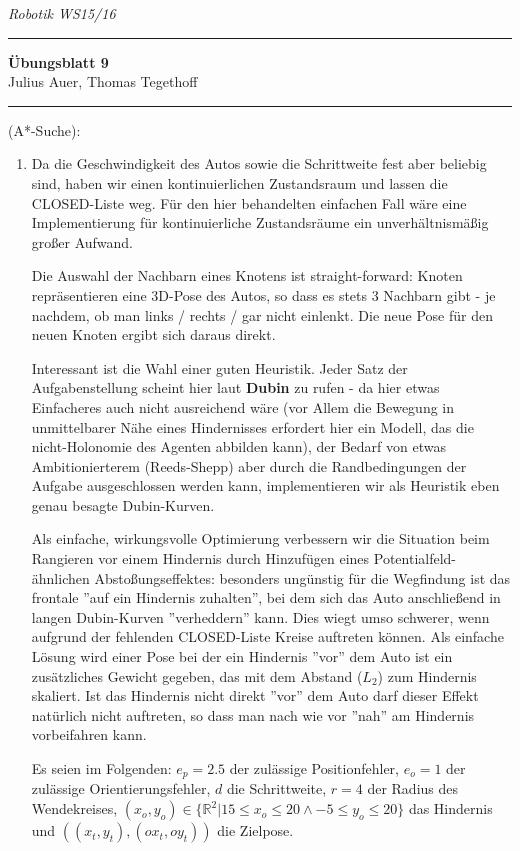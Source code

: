 \documentclass[a4paper, titlepage=false, parskip=full-, 10pt]{scrartcl}
\newcounter{tasknbr}
\newenvironment{task}[1]{{\bf Aufgabe \arabic {tasknbr}\stepcounter{tasknbr}} (#1):\begin{enumerate}}{\end{enumerate}}
\newcommand{\lecture}{Robotik WS15/16}
\newcommand{\tutor}{}
\newcommand{\assignmentnbr}{9}
\newcommand{\students}{Julius Auer, Thomas Tegethoff}
\begin{document}
  
{\small \textsl{\lecture \hfill \tutor}}
\hrule
\begin{center}
\textbf{Übungsblatt \assignmentnbr}\\
[\bigskipamount]
{\small \students}
\end{center}
\hrule

\begin{task}{A*-Suche}
\item[]
Da die Geschwindigkeit des Autos sowie die Schrittweite fest aber beliebig sind, haben wir einen kontinuierlichen Zustandsraum und lassen die CLOSED-Liste weg. Für den hier behandelten einfachen Fall wäre eine Implementierung für kontinuierliche Zustandsräume ein unverhältnismäßig großer Aufwand.

Die Auswahl der Nachbarn eines Knotens ist straight-forward: Knoten repräsentieren eine 3D-Pose des Autos, so dass es stets 3 Nachbarn gibt - je nachdem, ob man links / rechts / gar nicht einlenkt. Die neue Pose für den neuen Knoten ergibt sich daraus direkt.

Interessant ist die Wahl einer guten Heuristik. Jeder Satz der Aufgabenstellung scheint hier laut {\bf Dubin} zu rufen - da hier etwas Einfacheres auch nicht ausreichend wäre (vor Allem die Bewegung in unmittelbarer Nähe eines Hindernisses erfordert hier ein Modell, das die nicht-Holonomie des Agenten abbilden kann), der Bedarf von etwas Ambitionierterem (Reeds-Shepp) aber durch die Randbedingungen der Aufgabe ausgeschlossen werden kann, implementieren wir als Heuristik eben genau besagte Dubin-Kurven.

Als einfache, wirkungsvolle Optimierung verbessern wir die Situation beim Rangieren vor einem Hindernis durch Hinzufügen eines Potentialfeld-ähnlichen Abstoßungseffektes: besonders ungünstig für die Wegfindung ist das frontale ''auf ein Hindernis zuhalten'', bei dem sich das Auto anschließend in langen Dubin-Kurven ''verheddern'' kann. Dies wiegt umso schwerer, wenn aufgrund der fehlenden CLOSED-Liste Kreise auftreten können. Als einfache Lösung wird einer Pose bei der ein Hindernis ''vor'' dem Auto ist ein zusätzliches Gewicht gegeben, das mit dem Abstand ($L_2$) zum Hindernis skaliert. Ist das Hindernis nicht direkt ''vor'' dem Auto darf dieser Effekt natürlich nicht auftreten, so dass man nach wie vor ''nah'' am Hindernis vorbeifahren kann.

Es seien im Folgenden: $e_p=2.5$ der zulässige Positionfehler, $e_o=1$ der zulässige Orientierungsfehler, $d$ die Schrittweite, $r=4$ der Radius des Wendekreises, $(x_o,y_o)\in\{\mathbb{R}^2|15\le x_o\le20\wedge -5\le y_o\le 20\}$ das Hindernis und $((x_t,y_t),(ox_t,oy_t))$ die Zielpose.


\end{task}
\end{document}
